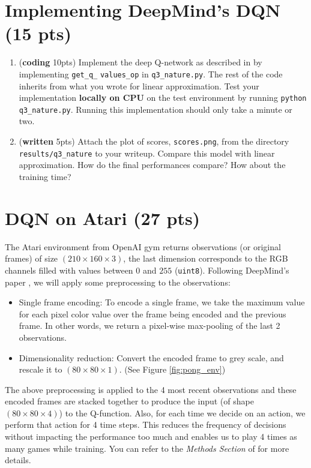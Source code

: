 \documentclass{article}
\newenvironment{myitemize}
{ \begin{itemize}
		\setlength{\itemsep}{0pt}
		\setlength{\parskip}{0pt}
		\setlength{\parsep}{0pt}     }
	{ \end{itemize}                  }
\begin{document}
\section{Implementing DeepMind's DQN (15 pts)}

\begin{enumerate}

\item (\textbf{coding} 10pts) Implement the deep Q-network as described in \cite{mnih2015human} by implementing \texttt{get\_q\_} \texttt{values\_op} in \texttt{q3\_nature.py}. The rest of the code inherits from what you wrote for linear approximation. Test your implementation \textbf{locally on CPU} on the test environment by running \texttt{python q3\_nature.py}.  Running this implementation should only take a minute or two.

\item (\textbf{written} 5pts) Attach the plot of scores, \texttt{scores.png}, from the directory \texttt{results/q3\_nature} to your writeup. Compare this model with linear approximation. How do the final performances compare? How about the training time? 

\end{enumerate}

\section{DQN on Atari (27 pts)}

The Atari environment from OpenAI gym returns observations (or original frames) of size $ (210 \times 160 \times 3) $, the last dimension corresponds to the RGB channels filled with values between $ 0 $ and $ 255 $ (\texttt{uint8}). Following DeepMind's paper \cite{mnih2015human}, we will apply some preprocessing to the observations:   
\begin{myitemize}
\item Single frame encoding: To encode a single frame, we take the maximum value for each pixel color value over the frame being encoded and the previous frame. In other words, we return a pixel-wise max-pooling of the last 2 observations.     
\item Dimensionality reduction: Convert the encoded frame to grey scale, and rescale it to $(80 \times 80 \times 1)$. (See Figure \ref{fig:pong_env})     
\end{myitemize}

The above preprocessing is applied to the 4 most recent observations and these encoded frames are stacked together to produce the input (of shape $(80 \times 80 \times 4)$) to the Q-function. Also, for each time we decide on an action, we perform that action for 4 time steps. This reduces the frequency of decisions without impacting the performance too much and enables us to play 4 times as many games while training. You can refer to the \textit{Methods Section} of \cite{mnih2015human} for more details.       \\  
\end{document}
